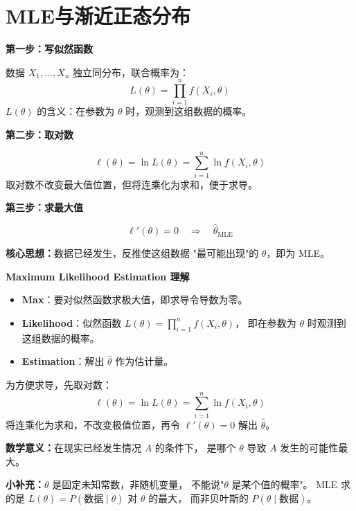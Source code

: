 \section{MLE与渐近正态分布}
\begin{note}[MLE就是一种构造估计量的方式]

    \textbf{第一步：写似然函数}

数据 $X_1, \ldots, X_n$ 独立同分布，联合概率为：
$$L(\theta) = \prod_{i=1}^n f(X_i, \theta)$$
$L(\theta)$ 的含义：在参数为 $\theta$ 时，观测到这组数据的概率。

\textbf{第二步：取对数}

$$\ell(\theta) = \ln L(\theta) = \sum_{i=1}^n \ln f(X_i, \theta)$$
取对数不改变最大值位置，但将连乘化为求和，便于求导。

\textbf{第三步：求最大值}

$$\ell'(\theta) = 0 \quad \Longrightarrow \quad \hat{\theta}_{\mathrm{MLE}}$$

\textbf{核心思想：}数据已经发生，反推使这组数据
"最可能出现"的 $\theta$，即为 MLE。
\end{note}
\begin{dxtips}
   \textbf{Maximum Likelihood Estimation 理解}

\begin{itemize}
  \item \textbf{Max}：要对似然函数求极大值，即求导令导数为零。
  \item \textbf{Likelihood}：似然函数 $L(\theta) = \prod_{i=1}^n f(X_i, \theta)$，
        即在参数为 $\theta$ 时观测到这组数据的概率。
  \item \textbf{Estimation}：解出 $\hat{\theta}$ 作为估计量。
\end{itemize}

为方便求导，先取对数：
$$\ell(\theta) = \ln L(\theta) = \sum_{i=1}^n \ln f(X_i, \theta)$$
将连乘化为求和，不改变极值位置，再令 $\ell'(\theta) = 0$ 解出 $\hat{\theta}$。

\textbf{数学意义：}在现实已经发生情况 $A$ 的条件下，
是哪个 $\theta$ 导致 $A$ 发生的可能性最大。

\textbf{小补充：}$\theta$ 是固定未知常数，非随机变量，
不能说"$\theta$ 是某个值的概率"。
MLE 求的是 $L(\theta)=P(\text{数据}\mid\theta)$ 对 $\theta$ 的最大，
而非贝叶斯的 $P(\theta\mid\text{数据})$。
\end{dxtips}

